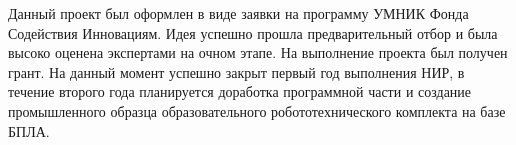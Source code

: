 \documentclass[a4paper,12pt]{article}
\begin{document}
Данный проект был оформлен в виде заявки на программу УМНИК Фонда Содействия Инновациям. Идея успешно прошла предварительный отбор \cite{umnik} и была высоко оценена экспертами на очном этапе. На выполнение проекта был получен грант. На данный момент успешно закрыт первый год выполнения НИР, в течение второго года планируется доработка программной части и создание промышленного образца образовательного робототехнического комплекта на базе БПЛА.
\pagebreak

\printbibliography

\pagebreak
\end{document}

